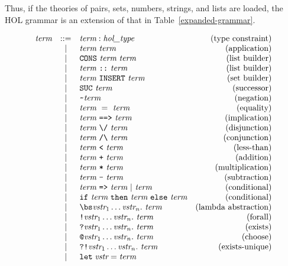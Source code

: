 {Thus, if the theories of pairs, sets, numbers, strings, and lists are
loaded, the HOL grammar is an extension of that in
Table~\ref{expanded-grammar}.

\begin{table}
  \[
  \begin{array}{rclr}
    \term & ::= & \term : \type & \mbox{(type constraint)} \\
    & | & \term\ \term & \mbox{(application)} \\
    & | & \CONS\ \term \ \term & \mbox{(list builder)} \\
    & | & \term\ \verb|::|\ \term & \mbox{(list builder)}\\
    & | & \term \ \INSERT\ \term & \mbox{(set builder)} \\
    & | & \SUC\ \term & \mbox{(successor)} \\
    & | & \verb+~+ \term & \mbox{(negation)} \\
    & | & \term\ =\ \term & \mbox{(equality)} \\
    & | & \term\ \IMP\ \term & \mbox{(implication)} \\
    & | & \term\ \verb+\/+\ \term & \mbox{(disjunction)} \\
    & | & \term\ \verb+/\+\ \term & \mbox{(conjunction)} \\
    & | & \term\ \verb+<+ \ \term & \mbox{(less-than)} \\
    & | & \term\ \verb!+! \ \term & \mbox{(addition)} \\
    & | & \term\ \verb!*! \ \term & \mbox{(multiplication)} \\
    & | & \term\ \verb!-! \ \term & \mbox{(subtraction)} \\
    & | & \term\ \verb+=>+\ \term\ |\ \term & \mbox{(conditional)} \\
    & | & \verb|if|\ \term\ \verb|then|\ \term\ \verb|else|\ \term & \mbox{(conditional)}\\
    & | & \bs\vstr_1\ldots\vstr_n.\ \term & \mbox{(lambda abstraction)} \\
    & | & \ALL \vstr_1\ldots\vstr_n.\ \term & \mbox{(forall)} \\
    & | & \EXISTS \vstr_1\ldots\vstr_n.\ \term & \mbox{(exists)} \\
    & | & \CHOOSE \vstr_1\ldots\vstr_n.\ \term & \mbox{(choose)} \\
    & | & \EXISTSONE \vstr_1\ldots\vstr_n.\ \term &\mbox{(exists-unique)} \\
    & | & \LET\; \vstr = \term  & \\

\end{array}\]
\end{table}}
